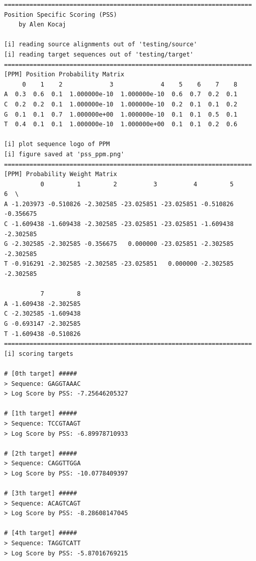 \captionsetup[lstlisting]{format=hang, margin=5pt}
\begin{lstlisting}[caption=Der Konsolenoutput des PSS Programms. Als Zielsequenzen zum Berechnen eines Scores wurde dasselbe File verwendet\, wie zum Einlesen des alignierten Sequenzen.]
====================================================================
Position Specific Scoring (PSS)
	by Alen Kocaj

[i] reading source alignments out of 'testing/source'
[i] reading target sequences out of 'testing/target'
====================================================================
[PPM] Position Probability Matrix
	 0    1    2             3             4    5    6    7    8
A  0.3  0.6  0.1  1.000000e-10  1.000000e-10  0.6  0.7  0.2  0.1
C  0.2  0.2  0.1  1.000000e-10  1.000000e-10  0.2  0.1  0.1  0.2
G  0.1  0.1  0.7  1.000000e+00  1.000000e-10  0.1  0.1  0.5  0.1
T  0.4  0.1  0.1  1.000000e-10  1.000000e+00  0.1  0.1  0.2  0.6

[i] plot sequence logo of PPM
[i] figure saved at 'pss_ppm.png'
====================================================================
[PPM] Probability Weight Matrix
		  0         1         2          3          4         5         6  \
A -1.203973 -0.510826 -2.302585 -23.025851 -23.025851 -0.510826 -0.356675   
C -1.609438 -1.609438 -2.302585 -23.025851 -23.025851 -1.609438 -2.302585   
G -2.302585 -2.302585 -0.356675   0.000000 -23.025851 -2.302585 -2.302585   
T -0.916291 -2.302585 -2.302585 -23.025851   0.000000 -2.302585 -2.302585   

		  7         8  
A -1.609438 -2.302585  
C -2.302585 -1.609438  
G -0.693147 -2.302585  
T -1.609438 -0.510826  
====================================================================
[i] scoring targets

# [0th target] #####
> Sequence: GAGGTAAAC
> Log Score by PSS: -7.25646205327

# [1th target] #####
> Sequence: TCCGTAAGT
> Log Score by PSS: -6.89978710933

# [2th target] #####
> Sequence: CAGGTTGGA
> Log Score by PSS: -10.0778409397

# [3th target] #####
> Sequence: ACAGTCAGT
> Log Score by PSS: -8.28608147045

# [4th target] #####
> Sequence: TAGGTCATT
> Log Score by PSS: -5.87016769215


\end{lstlisting}
